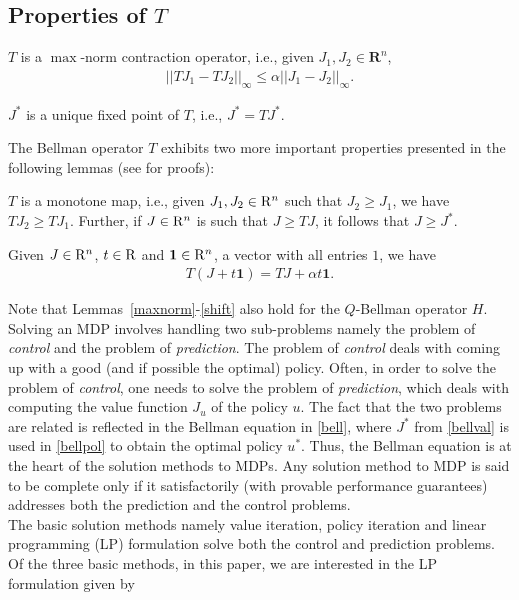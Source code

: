 \subsection{Properties of $T$}
\begin{lemma}\label{maxnorm}
$T$ is a $\max$-norm contraction operator, i.e., given $J_1, J_2 \in \mathbf{R}^n$,
\begin{align}
||TJ_1-TJ_2||_\infty\leq \alpha ||J_1-J_2||_\infty.
\end{align}
\end{lemma}
\begin{corollary}\label{uniquesol}
$J^*$ is a unique fixed point of $T$, i.e., $J^*=TJ^*$.
\end{corollary}
The Bellman operator $T$ exhibits two more important properties presented in the following lemmas (see \cite{BertB} for proofs):
\begin{lemma}\label{monotone}
$T$ is a monotone map, i.e., given $J_1,J_2 \in \mathrm{R}^n$ such that $J_2\geq J_1$, we have $T J_2\geq T J_1$. Further, if $J\in \mathrm{R}^n$ is such that $J\geq TJ$, it follows that $J\geq J^*$.
\end{lemma}
\begin{lemma}\label{shift}
Given $J\in \mathrm{R}^n$, $t \in \mathrm{R}$ and $\mathbf{1} \in \mathrm{R}^n$, a vector with all entries $1$, we have
\begin{align}
T(J+t\mathbf{1})=TJ+\alpha t\mathbf{1}.
\end{align}
\end{lemma}
Note that Lemmas~\ref{maxnorm}-\ref{shift} also hold for the $Q$-Bellman operator $H$.
Solving an MDP involves handling two sub-problems namely the problem of \emph{control} and the problem of \emph{prediction}. The problem of \emph{control} deals with coming up with a good (and if possible the optimal) policy. Often, in order to solve the problem of \emph{control}, one needs to solve the problem of \emph{prediction}, which deals with computing the value function $J_u$ of the policy $u$. The fact that the two problems are related is reflected in the Bellman equation in \eqref{bell}, where $J^*$ from \eqref{bellval} is used in \eqref{bellpol} to obtain the optimal policy $u^*$. Thus, the Bellman equation is at the heart of the solution methods to MDPs. Any solution method to MDP is said to be complete only if it satisfactorily (with provable performance guarantees) addresses both the prediction and the control problems. \\
The basic solution methods namely value iteration, policy iteration and linear programming (LP) formulation \cite{BertB} solve both the control and prediction problems. Of the three basic methods, in this paper, we are interested in the LP formulation given by
